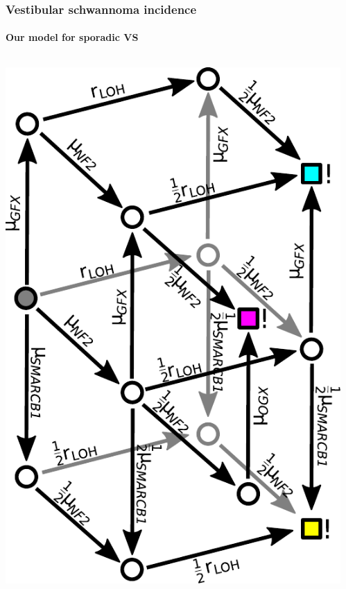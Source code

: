 \documentclass{beamer}
\begin{document}
\begin{frame}
    \frametitle{Vestibular schwannoma incidence}
    \framesubtitle{Our model for sporadic VS}
    \begin{columns}
        \begin{column}{0.5\textwidth}
            \includegraphics[height=0.8\textheight]{figures/vsmodel-nochromosomes.pdf}
        \end{column}
        \begin{column}{0.5\textwidth}

\end{column}
\end{columns}
\end{frame}
\end{document}
